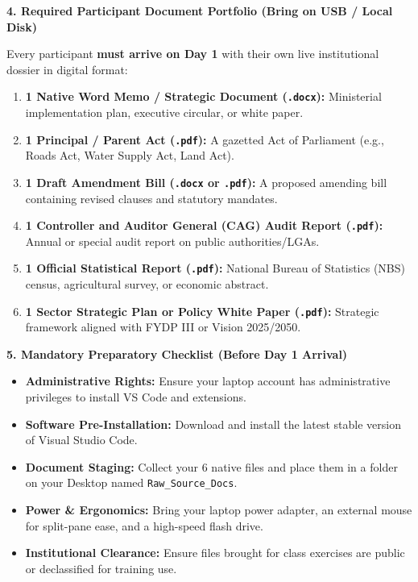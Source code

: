 \documentclass[10pt, a4paper]{article}
\begin{document}
\vspace{-0.15cm}
\noindent\textbf{\textcolor{tanzaniablue}{\large 4. Required Participant Document Portfolio (Bring on USB / Local Disk)}}
\vspace{0.1cm}

\noindent Every participant \textbf{must arrive on Day 1} with their own live institutional dossier in digital format:
\begin{enumerate}
    \item \textbf{1 Native Word Memo / Strategic Document (\texttt{.docx}):} Ministerial implementation plan, executive circular, or white paper.
    \item \textbf{1 Principal / Parent Act (\texttt{.pdf}):} A gazetted Act of Parliament (e.g., Roads Act, Water Supply Act, Land Act).
    \item \textbf{1 Draft Amendment Bill (\texttt{.docx} or \texttt{.pdf}):} A proposed amending bill containing revised clauses and statutory mandates.
    \item \textbf{1 Controller and Auditor General (CAG) Audit Report (\texttt{.pdf}):} Annual or special audit report on public authorities/LGAs.
    \item \textbf{1 Official Statistical Report (\texttt{.pdf}):} National Bureau of Statistics (NBS) census, agricultural survey, or economic abstract.
    \item \textbf{1 Sector Strategic Plan or Policy White Paper (\texttt{.pdf}):} Strategic framework aligned with FYDP III or Vision 2025/2050.
\end{enumerate}

\newpage

\noindent\textbf{\textcolor{tanzaniablue}{\large 5. Mandatory Preparatory Checklist (Before Day 1 Arrival)}}
\vspace{0.1cm}
\begin{itemize}
    \item[\textbf{[ \ ]}] \textbf{Administrative Rights:} Ensure your laptop account has administrative privileges to install VS Code and extensions.
    \item[\textbf{[ \ ]}] \textbf{Software Pre-Installation:} Download and install the latest stable version of Visual Studio Code.
    \item[\textbf{[ \ ]}] \textbf{Document Staging:} Collect your 6 native files and place them in a folder on your Desktop named \texttt{Raw\_Source\_Docs}.
    \item[\textbf{[ \ ]}] \textbf{Power \& Ergonomics:} Bring your laptop power adapter, an external mouse for split-pane ease, and a high-speed flash drive.
    \item[\textbf{[ \ ]}] \textbf{Institutional Clearance:} Ensure files brought for class exercises are public or declassified for training use.
\end{itemize}
\end{document}
